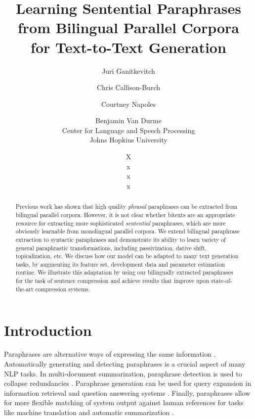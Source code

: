 \documentclass[11pt]{article}
\title{Learning Sentential Paraphrases from Bilingual Parallel Corpora \\ for Text-to-Text Generation}
\author{Juri Ganitkevitch \and Chris Callison-Burch \and Courtney
  Napoles \and Benjamin Van Durme\\ 
Center for Language and Speech Processing\\ 
Johns Hopkins University}
\author{X\\ 
x\\ 
x\\ 
x}
\date{}
\begin{document}
\maketitle

\begin{abstract}
  Previous work has shown that high quality {\it phrasal} paraphrases
  can be extracted from bilingual parallel corpora.  However, it is
  not clear whether bitexts are an appropriate resource for extracting
  more sophisticated {\it sentential} paraphrases, which are more
  obviously learnable from monolingual parallel corpora.  We extend
  bilingual paraphrase extraction to syntactic paraphrases and
  demonstrate its ability to learn variety of general paraphrastic
  transformations, including passivization, dative shift,
  topicalization, etc.  We discuss how our model can be adapted to
  many text generation tasks, by augmenting its feature set,
  development data and parameter estimation routine.  We illustrate
  this adaptation by using our bilingually extracted paraphrases for
  the task of sentence compression and achieve results that improve
  upon state-of-the-art compression systems.
\end{abstract}


\section{Introduction} \label{introduction}

Paraphrases are alternative ways of expressing the same information
\cite{Culicover1968}.  Automatically generating and detecting
paraphrases is a crucial aspect of many NLP tasks.  In multi-document
summarization, paraphrase detection is used to collapse redundancies
\cite{Barzilay1999,BarzilayThesis}. Paraphrase generation can be used
for query expansion in information retrieval and question answering
systems
\cite{mckeown:1979:ACL,Anick1999,Ravichandran2002,Riezler2007}.
Finally, paraphrases allow for more flexible matching of system output
against human references for tasks like machine translation and
automatic summarization
\cite{Zhou2006b,Kauchak2006,Owczarzak2006,Madnani2007,Snover2010}.
\end{document}
